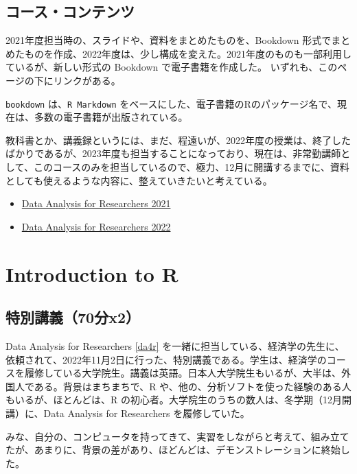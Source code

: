 \documentclass[
]{book}
\providecommand{\tightlist}{%
  \setlength{\itemsep}{0pt}\setlength{\parskip}{0pt}}
\theoremstyle{definition}
\theoremstyle{definition}
\theoremstyle{definition}
\theoremstyle{definition}
\theoremstyle{remark}
\begin{document}
\hypertarget{ux30b3ux30fcux30b9ux30b3ux30f3ux30c6ux30f3ux30c4}{%
\section{コース・コンテンツ}\label{ux30b3ux30fcux30b9ux30b3ux30f3ux30c6ux30f3ux30c4}}

2021年度担当時の、スライドや、資料をまとめたものを、Bookdown 形式でまとめたものを作成、2022年度は、少し構成を変えた。2021年度のものも一部利用しているが、新しい形式の Bookdown で電子書籍を作成した。
いずれも、このページの下にリンクがある。

\texttt{bookdown} は、\texttt{R\ Markdown} をベースにした、電子書籍のRのパッケージ名で、現在は、多数の電子書籍が出版されている。

教科書とか、講義録というには、まだ、程遠いが、2022年度の授業は、終了したばかりであるが、2023年度も担当することになっており、現在は、非常勤講師として、このコースのみを担当しているので、極力、12月に開講するまでに、資料としても使えるような内容に、整えていきたいと考えている。

\begin{itemize}
\tightlist
\item
  \href{https://icu-hsuzuki.github.io/da4r2021/}{Data Analysis for Researchers 2021}
\item
  \href{https://icu-hsuzuki.github.io/da4r2022/}{Data Analysis for Researchers 2022}
\end{itemize}

\hypertarget{intro2r}{%
\chapter{Introduction to R}\label{intro2r}}

\hypertarget{ux7279ux5225ux8b1bux7fa970ux5206x2}{%
\section{特別講義（70分x2）}\label{ux7279ux5225ux8b1bux7fa970ux5206x2}}

Data Analysis for Researchers \ref{da4r} を一緒に担当している、経済学の先生に、依頼されて、2022年11月2日に行った、特別講義である。学生は、経済学のコースを履修している大学院生。講義は英語。日本人大学院生もいるが、大半は、外国人である。背景はまちまちで、R や、他の、分析ソフトを使った経験のある人もいるが、ほとんどは、R の初心者。大学院生のうちの数人は、冬学期（12月開講）に、Data Analysis for Researchers を履修していた。

みな、自分の、コンピュータを持ってきて、実習をしながらと考えて、組み立てたが、あまりに、背景の差があり、ほどんどは、デモンストレーションに終始した。
\end{document}
